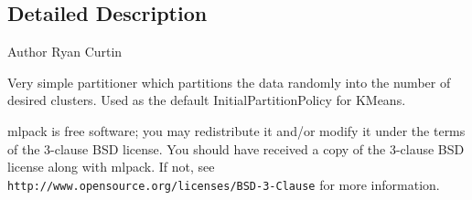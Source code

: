 \subsection{Detailed Description}
\begin{DoxyAuthor}{Author}
Ryan Curtin
\end{DoxyAuthor}
Very simple partitioner which partitions the data randomly into the number of desired clusters. Used as the default Initial\+Partition\+Policy for K\+Means.

mlpack is free software; you may redistribute it and/or modify it under the terms of the 3-\/clause B\+SD license. You should have received a copy of the 3-\/clause B\+SD license along with mlpack. If not, see {\tt http\+://www.\+opensource.\+org/licenses/\+B\+S\+D-\/3-\/\+Clause} for more information. 